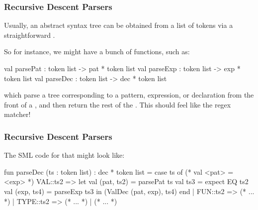\documentclass[aspectratio=169]{beamer}
\begin{document}
\begin{frame}[fragile]
  \frametitle{Recursive Descent Parsers}

  \rprs

  Usually, an abstract syntax tree can be obtained from a list of tokens via a
  straightforward .

  \pause
  \vspace{\fill}


  \pause
  \vspace{\fill}

  So for instance, we might have a bunch of functions, such as:
  \begin{codeblock}
    val parsePat : token list -> pat * token list
    val parseExp : token list -> exp * token list
    val parseDec : token list -> dec * token list
  \end{codeblock}

  which parse a tree corresponding to a pattern, expression, or declaration from
  the front of a , and then return the rest of the .
  This should feel like the regex matcher!
\end{frame}

\begin{frame}[fragile]
  \frametitle{Recursive Descent Parsers}

  The SML code for that might look like:

  \pause
  \small
  \begin{codeblock}
    fun parseDec (ts : token list) : dec * token list =
      case ts of
        (* val <pat> = <exp> *)
        VAL::ts2 =>
          let
            val (pat, ts2) = parsePat ts
            val ts3 = expect EQ ts2
            val (exp, ts4) = parseExp ts3
          in
            (ValDec (pat, exp), ts4)
          end
      | FUN::ts2 => (* ... *)
      | TYPE::ts2 => (* ... *)
      | (* ... *)
  \end{codeblock}
\end{frame}
\end{document}
